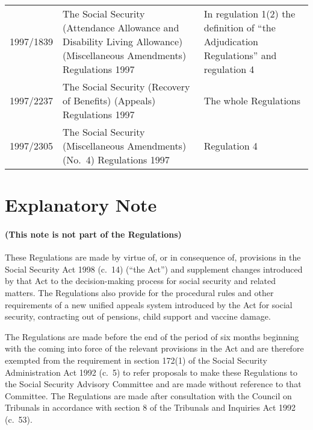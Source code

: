 \documentclass[12pt,a4paper]{article}
\begin{document}
{\begin{longtable}{p{50pt}p{188pt}p{116pt}}
1997/1839&The Social Security (Attendance Allowance and Disability Living Allowance) (Miscellaneous Amendments) Regulations 1997&In regulation 1(2) the definition of “the Adjudication Regulations” and regulation 4\\
1997/2237&The Social Security (Recovery of Benefits) (Appeals) Regulations 1997&The whole Regulations\\
1997/2305&The Social Security (Miscellaneous Amendments) (No.\ 4) Regulations 1997&Regulation 4\\
\end{longtable}

}


\part{Explanatory Note}

\renewcommand\parthead{--- Explanatory Note}

\subsection*{(This note is not part of the Regulations)}

 These Regulations are made by virtue of, or in consequence of, provisions in the Social Security Act 1998 (c.\ 14) (“the Act”) and supplement changes introduced by that Act to the decision-making process for social security and related matters. The Regulations also provide for the procedural rules and other requirements of a new unified appeals system introduced by the Act for social security, contracting out of pensions, child support and vaccine damage.

  The Regulations are made before the end of the period of six months beginning with the coming into force of the relevant provisions in the Act and are therefore exempted from the requirement in section 172(1) of the Social Security Administration Act 1992 (c.\ 5) to refer proposals to make these Regulations to the Social Security Advisory Committee and are made without reference to that Committee. The Regulations are made after consultation with the Council on Tribunals in accordance with section 8 of the Tribunals and Inquiries Act 1992 (c.\ 53).
\end{document}
